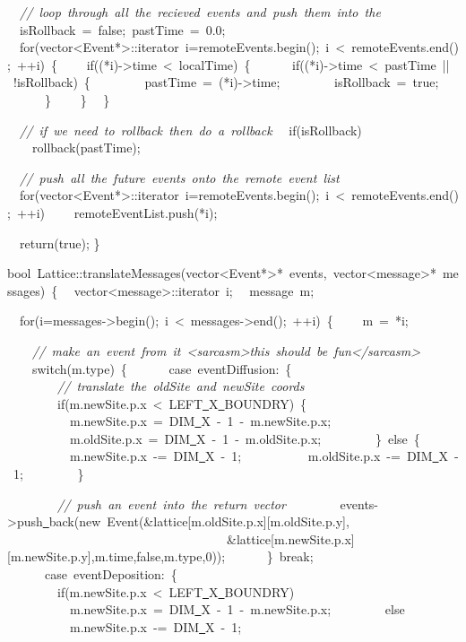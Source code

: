 {\ \ \textsl{//\ loop\ through\ all\ the\ recieved\ events\ and\ push\ them\ into\ the}
\ \ isRollback\ =\ false;\ pastTime\ =\ 0.0;
\ \ for(vector<{}Event*>{}::iterator\ i=remoteEvents.begin();\ i\ <{}\ remoteEvents.end();\ ++i)\ \{
\ \ \ \ if((*i)-{}>{}time\ <{}\ localTime)\ \{
\ \ \ \ \ \ if((*i)-{}>{}time\ <{}\ pastTime\ ||\ !isRollback)\ \{
\ \ \ \ \ \ \ \ pastTime\ =\ (*i)-{}>{}time;
\ \ \ \ \ \ \ \ isRollback\ =\ true;
\ \ \ \ \ \ \}
\ \ \ \ \}
\ \ \}

\ \ \textsl{//\ if\ we\ need\ to\ rollback\ then\ do\ a\ rollback}
\ \ if(isRollback)
\ \ \ \ rollback(pastTime);

\ \ \textsl{//\ push\ all\ the\ future\ events\ onto\ the\ remote\ event\ list}
\ \ for(vector<{}Event*>{}::iterator\ i=remoteEvents.begin();\ i\ <{}\ remoteEvents.end();\ ++i)
\ \ \ \ remoteEventList.push(*i);

\ \ return(true);
\}

bool\ Lattice::translateMessages(vector<{}Event*>{}*\ events,\ vector<{}message>{}*\ messages)\ \{
\ \ vector<{}message>{}::iterator\ i;
\ \ message\ m;

\ \ for(i=messages-{}>{}begin();\ i\ <{}\ messages-{}>{}end();\ ++i)\ \{
\ \ \ \ m\ =\ *i;

\ \ \ \ \textsl{//\ make\ an\ event\ from\ it\ <{}sarcasm>{}this\ should\ be\ fun<{}/sarcasm>{}}
\ \ \ \ switch(m.type)\ \{
\ \ \ \ \ \ case\ eventDiffusion:\ \{
\ \ \ \ \ \ \ \ \textsl{//\ translate\ the\ oldSite\ and\ newSite\ coords}
\ \ \ \ \ \ \ \ if(m.newSite.p.x\ <{}\ LEFT\underline\ X\underline\ BOUNDRY)\ \{
\ \ \ \ \ \ \ \ \ \ m.newSite.p.x\ =\ DIM\underline\ X\ -{}\ 1\ -{}\ m.newSite.p.x;
\ \ \ \ \ \ \ \ \ \ m.oldSite.p.x\ =\ DIM\underline\ X\ -{}\ 1\ -{}\ m.oldSite.p.x;
\ \ \ \ \ \ \ \ \}\ else\ \{
\ \ \ \ \ \ \ \ \ \ m.newSite.p.x\ -{}=\ DIM\underline\ X\ -{}\ 1;
\ \ \ \ \ \ \ \ \ \ m.oldSite.p.x\ -{}=\ DIM\underline\ X\ -{}\ 1;
\ \ \ \ \ \ \ \ \}

\ \ \ \ \ \ \ \ \textsl{//\ push\ an\ event\ into\ the\ return\ vector}
\ \ \ \ \ \ \ \ events-{}>{}push\underline\ back(new\ Event(\&lattice[m.oldSite.p.x][m.oldSite.p.y],
\ \ \ \ \ \ \ \ \ \ \ \ \ \ \ \ \ \ \ \ \ \ \ \ \ \ \ \ \ \ \ \ \ \ \ \&lattice[m.newSite.p.x][m.newSite.p.y],m.time,false,m.type,0));
\ \ \ \ \ \ \}\ break;
\ \ \ \ \ \ case\ eventDeposition:\ \{
\ \ \ \ \ \ \ \ if(m.newSite.p.x\ <{}\ LEFT\underline\ X\underline\ BOUNDRY)
\ \ \ \ \ \ \ \ \ \ m.newSite.p.x\ =\ DIM\underline\ X\ -{}\ 1\ -{}\ m.newSite.p.x;
\ \ \ \ \ \ \ \ else
\ \ \ \ \ \ \ \ \ \ m.newSite.p.x\ -{}=\ DIM\underline\ X\ -{}\ 1;

}
